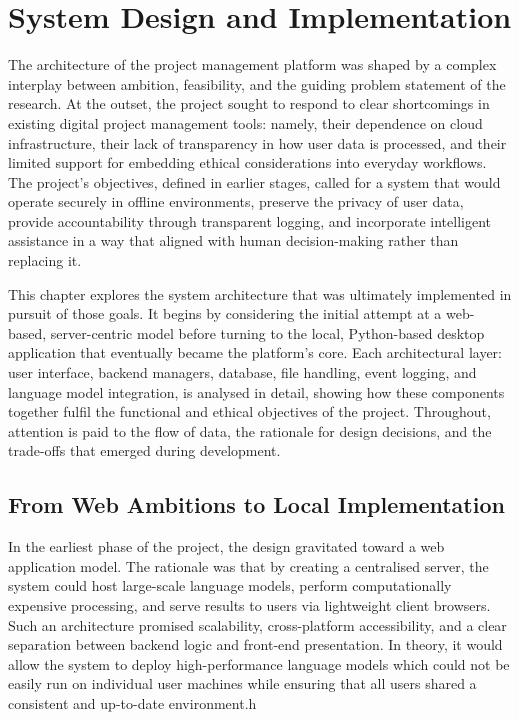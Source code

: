 \documentclass{report}
\begin{document}
\chapter{System Design and Implementation}

The architecture of the project management platform was shaped by a complex interplay between ambition, feasibility, and the guiding problem statement of the research. At the outset, the project sought to respond to clear shortcomings in existing digital project management tools: namely, their dependence on cloud infrastructure, their lack of transparency in how user data is processed, and their limited support for embedding ethical considerations into everyday workflows. The project's objectives, defined in earlier stages, called for a system that would operate securely in offline environments, preserve the privacy of user data, provide accountability through transparent logging, and incorporate intelligent assistance in a way that aligned with human decision-making rather than replacing it.

This chapter explores the system architecture that was ultimately implemented in pursuit of those goals. It begins by considering the initial attempt at a web-based, server-centric model before turning to the local, Python-based desktop application that eventually became the platform's core. Each architectural layer: user interface, backend managers, database, file handling, event logging, and language model integration, is analysed in detail, showing how these components together fulfil the functional and ethical objectives of the project. Throughout, attention is paid to the flow of data, the rationale for design decisions, and the trade-offs that emerged during development.

\section{From Web Ambitions to Local Implementation}

In the earliest phase of the project, the design gravitated toward a web application model. The rationale was that by creating a centralised server, the system could host large-scale language models, perform computationally expensive processing, and serve results to users via lightweight client browsers. Such an architecture promised scalability, cross-platform accessibility, and a clear separation between backend logic and front-end presentation. In theory, it would allow the system to deploy high-performance language models which could not be easily run on individual user machines while ensuring that all users shared a consistent and up-to-date environment.h
\end{document}
